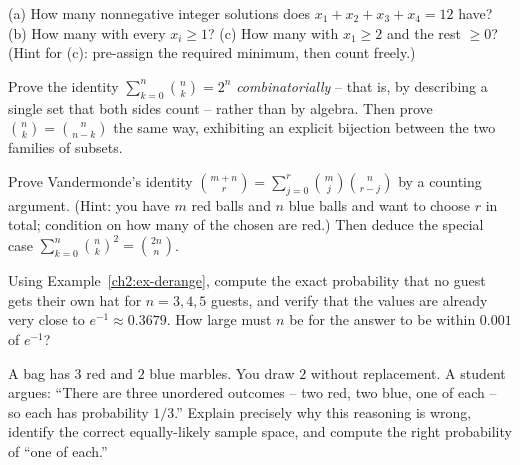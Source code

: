 \begin{exercise}
\label{ch2:exr-stars}
(a) How many nonnegative integer solutions does $x_1 + x_2 + x_3 + x_4 = 12$ have?
(b) How many with every $x_i \ge 1$? (c) How many with $x_1 \ge 2$ and the rest $\ge 0$?
(Hint for (c): pre-assign the required minimum, then count freely.)
\end{exercise}

\begin{exercise}
\label{ch2:exr-bijection}
Prove the identity $\sum_{k=0}^{n} \binom{n}{k} = 2^n$ \emph{combinatorially} -- that is,
by describing a single set that both sides count -- rather than by algebra. Then prove
$\binom{n}{k} = \binom{n}{n-k}$ the same way, exhibiting an explicit bijection between the
two families of subsets.
\end{exercise}

\begin{exercise}
\label{ch2:exr-vandermonde}
Prove Vandermonde's identity
$\binom{m+n}{r} = \sum_{j=0}^{r}\binom{m}{j}\binom{n}{r-j}$
by a counting argument. (Hint: you have $m$ red balls and $n$ blue balls and want to choose
$r$ in total; condition on how many of the chosen are red.) Then deduce the special case
$\sum_{k=0}^{n}\binom{n}{k}^2 = \binom{2n}{n}$.
\end{exercise}

\begin{exercise}
\label{ch2:exr-derange}
Using Example~\ref{ch2:ex-derange}, compute the exact probability that no guest gets their
own hat for $n = 3, 4, 5$ guests, and verify that the values are already very close to
$e^{-1} \approx 0.3679$. How large must $n$ be for the answer to be within $0.001$ of
$e^{-1}$?
\end{exercise}

\begin{exercise}
\label{ch2:exr-model}
A bag has $3$ red and $2$ blue marbles. You draw $2$ without replacement. A student argues:
``There are three unordered outcomes -- two red, two blue, one of each -- so each has
probability $1/3$.'' Explain precisely why this reasoning is wrong, identify the correct
equally-likely sample space, and compute the right probability of ``one of each.''
\end{exercise}
